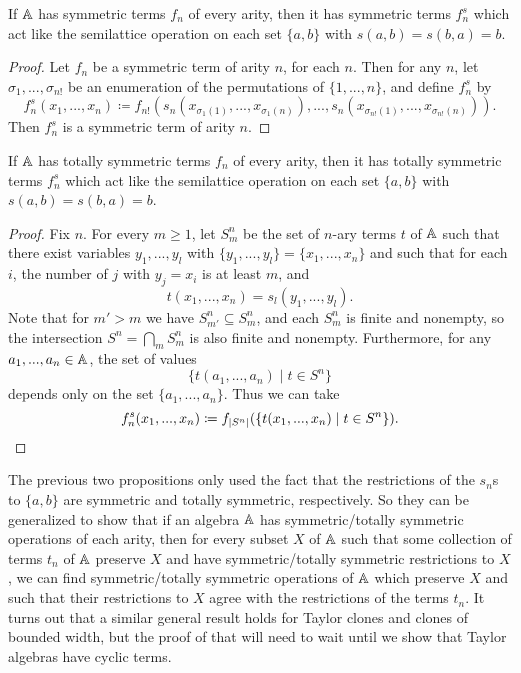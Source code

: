 \documentclass[letterpaper,11pt]{article}
\begin{document}
\begin{prop} If $\mathbb{A}$ has symmetric terms $f_n$ of every arity, then it has symmetric terms $f_n^s$ which act like the semilattice operation on each set $\{a,b\}$ with $s(a,b) = s(b,a) = b$.
\end{prop}
\begin{proof} Let $f_n$ be a symmetric term of arity $n$, for each $n$. Then for any $n$, let $\sigma_1, ..., \sigma_{n!}$ be an enumeration of the permutations of $\{1, ..., n\}$, and define $f_n^s$ by
\[
f_n^s(x_1, ..., x_n) \coloneqq f_{n!}(s_n(x_{\sigma_1(1)}, ..., x_{\sigma_1(n)}), ..., s_n(x_{\sigma_{n!}(1)}, ..., x_{\sigma_{n!}(n)})).
\]
Then $f_n^s$ is a symmetric term of arity $n$.
\end{proof}

\begin{prop} If $\mathbb{A}$ has totally symmetric terms $f_n$ of every arity, then it has totally symmetric terms $f_n^s$ which act like the semilattice operation on each set $\{a,b\}$ with $s(a,b) = s(b,a) = b$.
\end{prop}
\begin{proof} Fix $n$. For every $m \ge 1$, let $S^n_m$ be the set of $n$-ary terms $t$ of $\mathbb{A}$ such that there exist variables $y_1, ..., y_l$ with $\{y_1, ..., y_l\} = \{x_1, ..., x_n\}$ and such that for each $i$, the number of $j$ with $y_j = x_i$ is at least $m$, and
\[
t(x_1, ..., x_n) = s_l(y_1, ..., y_l).
\]
Note that for $m' > m$ we have $S^n_{m'} \subseteq S^n_m$, and each $S^n_m$ is finite and nonempty, so the intersection $S^n = \bigcap_m S^n_m$ is also finite and nonempty. Furthermore, for any $a_1, ..., a_n \in \mathbb{A}$, the set of values
\[
\{t(a_1, ..., a_n) \mid t \in S^n\}
\]
depends only on the set $\{a_1, ..., a_n\}$. Thus we can take
\[
f_n^s(x_1, ..., x_n) \coloneqq f_{|S^n|}(\{t(x_1, ..., x_n) \mid t \in S^n\}).\qedhere
\]
\end{proof}

\begin{rem} The previous two propositions only used the fact that the restrictions of the $s_n$s to $\{a,b\}$ are symmetric and totally symmetric, respectively. So they can be generalized to show that if an algebra $\mathbb{A}$ has symmetric/totally symmetric operations of each arity, then for every subset $X$ of $\mathbb{A}$ such that some collection of terms $t_n$ of $\mathbb{A}$ preserve $X$ and have symmetric/totally symmetric restrictions to $X$, we can find symmetric/totally symmetric operations of $\mathbb{A}$ which preserve $X$ and such that their restrictions to $X$ agree with the restrictions of the terms $t_n$. It turns out that a similar general result holds for Taylor clones and clones of bounded width, but the proof of that will need to wait until we show that Taylor algebras have cyclic terms.
\end{rem}
\end{document}

